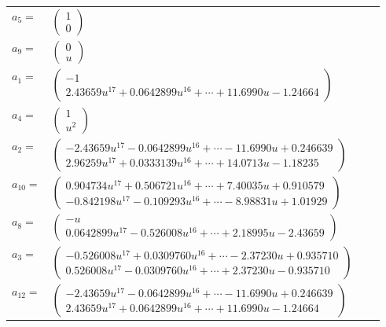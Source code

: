 \documentclass[1p]{elsarticle_modified}
\theoremstyle{definition}
\begin{document}
\begin{tabular}{m{7pt} m{180pt} m{7pt} m{180pt} }
\flushright $a_{5}=$&$\begin{pmatrix}1\\0\end{pmatrix}$ \\
\flushright $a_{9}=$&$\begin{pmatrix}0\\u\end{pmatrix}$ \\
\flushright $a_{1}=$&$\begin{pmatrix}-1\\2.43659 u^{17}+0.0642899 u^{16}+\cdots+11.6990 u-1.24664\end{pmatrix}$ \\
\flushright $a_{4}=$&$\begin{pmatrix}1\\u^2\end{pmatrix}$ \\
\flushright $a_{2}=$&$\begin{pmatrix}-2.43659 u^{17}-0.0642899 u^{16}+\cdots-11.6990 u+0.246639\\2.96259 u^{17}+0.0333139 u^{16}+\cdots+14.0713 u-1.18235\end{pmatrix}$ \\
\flushright $a_{10}=$&$\begin{pmatrix}0.904734 u^{17}+0.506721 u^{16}+\cdots+7.40035 u+0.910579\\-0.842198 u^{17}-0.109293 u^{16}+\cdots-8.98831 u+1.01929\end{pmatrix}$ \\
\flushright $a_{8}=$&$\begin{pmatrix}- u\\0.0642899 u^{17}-0.526008 u^{16}+\cdots+2.18995 u-2.43659\end{pmatrix}$ \\
\flushright $a_{3}=$&$\begin{pmatrix}-0.526008 u^{17}+0.0309760 u^{16}+\cdots-2.37230 u+0.935710\\0.526008 u^{17}-0.0309760 u^{16}+\cdots+2.37230 u-0.935710\end{pmatrix}$ \\
\flushright $a_{12}=$&$\begin{pmatrix}-2.43659 u^{17}-0.0642899 u^{16}+\cdots-11.6990 u+0.246639\\2.43659 u^{17}+0.0642899 u^{16}+\cdots+11.6990 u-1.24664\end{pmatrix}$ \\

\end{tabular}
\end{document}

